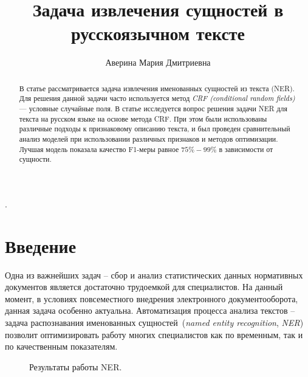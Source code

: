 \documentclass{csmathnotes}
\title{Задача извлечения сущностей в русскоязычном тексте}
\author{Аверина Мария Дмитриевна}
\affiliation{Ярославский государственный университет им. П.\,Г. Демидова}
\begin{document}
\maketitle

\begin{abstract}
В статье рассматривается задача извлечения именованных сущностей из текста (NER).
Для решения данной задачи часто используется метод \emph{CRF (conditional random fields)} --- условные случайные поля.
В статье исследуется вопрос решения задачи NER для текста на русском языке на основе метода CRF.
При этом были использованы различные подходы к признаковому описанию текста, 
и был проведен сравнительный анализ моделей при использовании различных признаков и методов оптимизации.
Лучшая модель показала качество F1-меры равное $75\%-99\%$ в зависимости от сущности.
\end{abstract}

.

\section*{Введение}
Одна из важнейших задач – сбор и анализ статистических данных нормативных
документов является достаточно трудоемкой для специалистов. На данный момент, в условиях повсеместного внедрения электронного документооборота, данная задача особенно актуальна. Автоматизация процесса анализа текстов – задача распознавания именованных сущностей~(\emph{named entity recognition}, \emph{NER})~\cite{base} позволит оптимизировать работу многих специалистов как по временным, так и по качественным показателям.

\begin{figure}[h]
    \caption{Результаты работы NER.}
    \label{fig:ner}
\end{figure}
\end{document}
